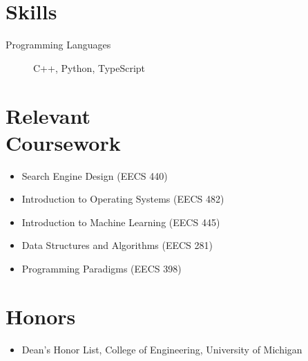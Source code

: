 \documentclass{mycv}
\begin{document}
\section{Skills}

\begin{description}
  \item[Programming Languages] C++, Python, TypeScript
\end{description}

\section{Relevant\\Coursework}
\begin{itemize}
  \item Search Engine Design (EECS 440)
  \item Introduction to Operating Systems (EECS 482)
  \item Introduction to Machine Learning (EECS 445)
  \item Data Structures and Algorithms (EECS 281)
  \item Programming Paradigms (EECS 398)
\end{itemize}

\section{Honors}
\begin{itemize}
  \item Dean's Honor List, College of Engineering, University of Michigan
\end{itemize}
\end{document}
